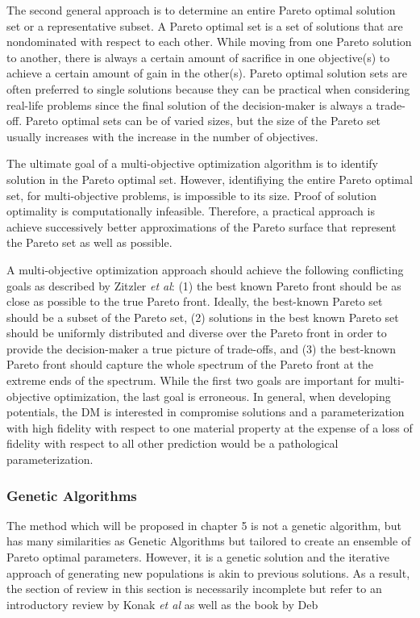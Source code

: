 The second general approach is to determine an entire Pareto optimal solution set or a representative subset. A Pareto optimal set is a set of solutions that are nondominated with respect to each other. While moving from one Pareto solution to another, there is always a certain amount of sacrifice in one objective(s) to achieve a certain amount of gain in the other(s). Pareto optimal solution sets are often preferred to single solutions because they can be practical when considering real-life problems since the final solution of the decision-maker is always a trade-off. Pareto optimal sets can be of varied sizes, but the size of the Pareto set usually increases with the increase in the number of objectives.

The ultimate goal of a multi-objective optimization algorithm is to identify solution in the Pareto optimal set.  However, identifiying the entire Pareto optimal set, for multi-objective problems, is impossible to its size.  Proof of solution optimality is computationally infeasible.  Therefore, a practical approach is achieve successively better approximations of the Pareto surface that represent the Pareto set as well as possible.

A multi-objective optimization approach should achieve the following conflicting goals as described by Zitzler \emph{et al}\cite{zitzler2000_moo_evolve}: (1) the best known Pareto front should be as close as possible to the true Pareto front.  Ideally, the best-known Pareto set should be a subset of the Pareto set, (2) solutions in the best known Pareto set should be uniformly distributed and diverse over the Pareto front in order to provide the decision-maker a true picture of trade-offs, and (3) the best-known Pareto front should capture the whole spectrum of the Pareto front at the extreme ends of the spectrum.  While the first two goals are important for multi-objective optimization, the last goal is erroneous.  In general, when developing potentials, the DM is interested in compromise solutions and a parameterization with high fidelity with respect to one material property at the expense of a loss of fidelity with respect to all other prediction would be a pathological parameterization.

\subsubsection{Genetic Algorithms}
The method which will be proposed in chapter 5 is not a genetic algorithm, but has many similarities as Genetic Algorithms but tailored to create an ensemble of Pareto optimal parameters.  However, it is a genetic solution and the iterative approach of generating new populations is akin to previous solutions.  As a result, the section of review in this section is necessarily incomplete but refer to an introductory review by Konak \emph{et al}\cite{Konak2006_moo_ga} as well as the book by Deb\cite{deb2001_moo_ga}



